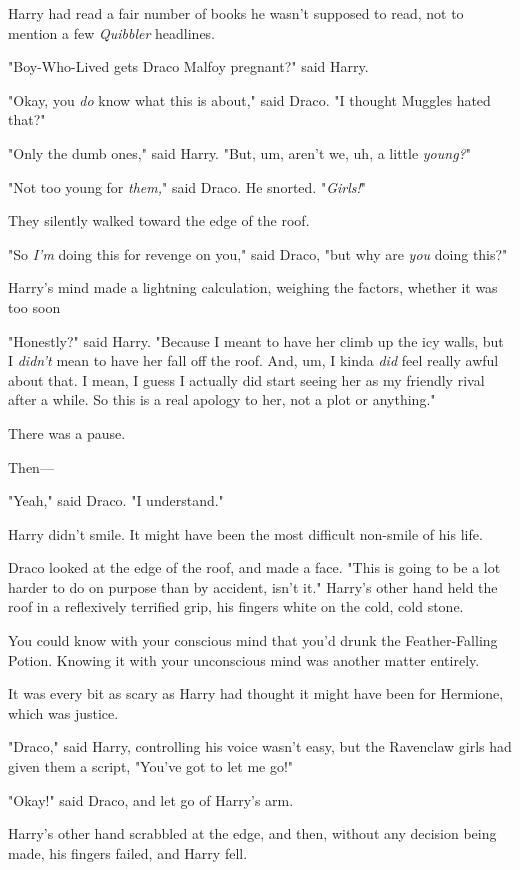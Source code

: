 Harry had read a fair number of books he wasn't supposed to read, not to
mention a few \emph{Quibbler} headlines.

"Boy-Who-Lived gets Draco Malfoy pregnant?" said Harry.

"Okay, you \emph{do} know what this is about," said Draco. "I thought Muggles
hated that?"

"Only the dumb ones," said Harry. "But, um, aren't we, uh, a little
\emph{young?}"

"Not too young for \emph{them,}" said Draco. He snorted. "\emph{Girls!}"

They silently walked toward the edge of the roof.

"So \emph{I'm} doing this for revenge on you," said Draco, "but why are
\emph{you} doing this?"

Harry's mind made a lightning calculation, weighing the factors, whether it was
too soon{\el}

"Honestly?" said Harry. "Because I meant to have her climb up the icy walls,
but I \emph{didn't} mean to have her fall off the roof. And, um, I kinda
\emph{did} feel really awful about that. I mean, I guess I actually did start
seeing her as my friendly rival after a while. So this is a real apology to
her, not a plot or anything."

There was a pause.

Then---

"Yeah," said Draco. "I understand."

Harry didn't smile. It might have been the most difficult non-smile of his life.

Draco looked at the edge of the roof, and made a face. "This is going to be a
lot harder to do on purpose than by accident, isn't it."
\sbreak
Harry's other hand held the roof in a reflexively terrified grip, his fingers
white on the cold, cold stone.

You could know with your conscious mind that you'd drunk the Feather-Falling
Potion. Knowing it with your unconscious mind was another matter entirely.

It was every bit as scary as Harry had thought it might have been for Hermione,
which was justice.

"Draco," said Harry, controlling his voice wasn't easy, but the Ravenclaw girls
had given them a script, "You've got to let me go!"

"Okay!" said Draco, and let go of Harry's arm.

Harry's other hand scrabbled at the edge, and then, without any decision being
made, his fingers failed, and Harry fell.

